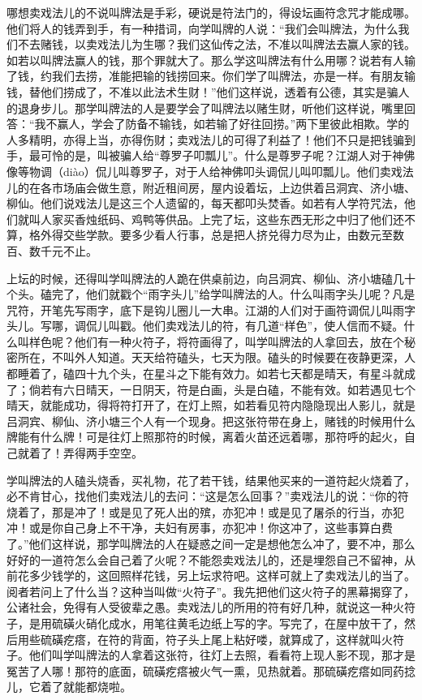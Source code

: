 \documentclass[12pt,UTF8]{ctexbook}
\begin{document}
哪想卖戏法儿的不说叫牌法是手彩，硬说是符法门的，得设坛画符念咒才能成哪。他们将人的钱弄到手，有一种措词，向学叫牌的人说：“我们会叫牌法，为什么我们不去赌钱，以卖戏法儿为生哪？我们这仙传之法，不准以叫牌法去赢人家的钱。如若以叫牌法赢人的钱，那个罪就大了。那么学这叫牌法有什么用哪？说若有人输了钱，约我们去捞，准能把输的钱捞回来。你们学了叫牌法，亦是一样。有朋友输钱，替他们捞成了，不准以此法术生财！”他们这样说，透着有公德，其实是骗人的退身步儿。那学叫牌法的人是要学会了叫牌法以赌生财，听他们这样说，嘴里回答：“我不赢人，学会了防备不输钱，如若输了好往回捞。”两下里彼此相欺。学的人多精明，亦得上当，亦得伤财；卖戏法儿的可得了利益了！他们不只是把钱骗到手，最可怜的是，叫被骗人给“尊罗子叩瓢儿”。什么是尊罗子呢？江湖人对于神佛像等物调（diào）侃儿叫尊罗子，对于人给神佛叩头调侃儿叫叩瓢儿。他们卖戏法儿的在各市场庙会做生意，附近租间房，屋内设着坛，上边供着吕洞宾、济小塘、柳仙。他们说戏法儿是这三个人遗留的，每天都叩头焚香。如若有人学符咒法，他们就叫人家买香烛纸码、鸡鸭等供品。上完了坛，这些东西无形之中归了他们还不算，格外得交些学款。要多少看人行事，总是把人挤兑得力尽为止，由数元至数百、数千元不止。

上坛的时候，还得叫学叫牌法的人跪在供桌前边，向吕洞宾、柳仙、济小塘磕几十个头。磕完了，他们就戳个“雨字头儿”给学叫牌法的人。什么叫雨字头儿呢？凡是咒符，开笔先写雨字，底下是钩儿圈儿一大串。江湖的人们对于画符调侃儿叫雨字头儿。写哪，调侃儿叫戳。他们卖戏法儿的符，有几道“样色”，使人信而不疑。什么叫样色呢？他们有一种火符子，将符画得了，叫学叫牌法的人拿回去，放在个秘密所在，不叫外人知道。天天给符磕头，七天为限。磕头的时候要在夜静更深，人都睡着了，磕四十九个头，在星斗之下能有效力。如若七天都是晴天，有星斗就成了；倘若有六日晴天，一日阴天，符是白画，头是白磕，不能有效。如若遇见七个晴天，就能成功，得将符打开了，在灯上照，如若看见符内隐隐现出人影儿，就是吕洞宾、柳仙、济小塘三个人有一个现身。把这张符带在身上，赌钱的时候用什么牌能有什么牌！可是往灯上照那符的时候，离着火苗还远着哪，那符呼的起火，自己就着了！弄得两手空空。

学叫牌法的人磕头烧香，买礼物，花了若干钱，结果他买来的一道符起火烧着了，必不肯甘心，找他们卖戏法儿的去问：“这是怎么回事？”卖戏法儿的说：“你的符烧着了，那是冲了！或是见了死人出的殡，亦犯冲！或是见了屠杀的行当，亦犯冲！或是你自己身上不干净，夫妇有房事，亦犯冲！你这冲了，这些事算白费了。”他们这样说，那学叫牌法的人在疑惑之间一定是想他怎么冲了，要不冲，那么好好的一道符怎么会自己着了火呢？不能怨卖戏法儿的，还是埋怨自己不留神，从前花多少钱学的，这回照样花钱，另上坛求符吧。这样可就上了卖戏法儿的当了。阅者若问上了什么当？这种当叫做“火符子”。我先把他们这火符子的黑幕揭穿了，公诸社会，免得有人受彼辈之愚。卖戏法儿的所用的符有好几种，就说这一种火符子，是用硫磺火硝化成水，用笔往黄毛边纸上写的字。写完了，在屋中放干了，然后用些硫磺疙瘩，在符的背面，符子头上尾上粘好喽，就算成了，这样就叫火符子。他们叫学叫牌法的人拿着这张符，往灯上去照，看看符上现人影不现，那才是冤苦了人哪！那符的底面，硫磺疙瘩被火气一熏，见热就着。那硫磺疙瘩如同药捻儿，它着了就能都烧啦。
\end{document}
